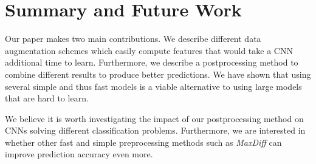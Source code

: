 \documentclass[10pt,conference,compsocconf]{IEEEtran}
\begin{document}
\section{Summary and Future Work}
Our paper makes two main contributions. We describe different data augmentation schemes which easily compute features that would take a CNN additional time to learn. Furthermore, we describe a postprocessing method to combine different results to produce better predictions. We have shown that using several simple and thus fast models is a viable alternative to using large models that are hard to learn.

We believe it is worth investigating the impact of our postprocessing method on CNNs solving different classification problems.
Furthermore, we are interested in whether other fast and simple preprocessing methods such as \emph{MaxDiff} can improve prediction accuracy even more.



\end{document}
